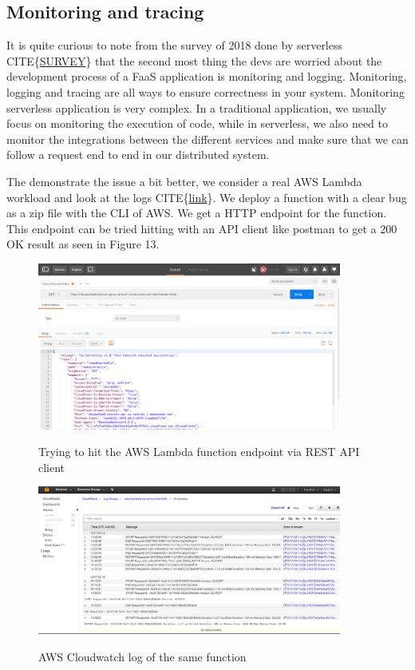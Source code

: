\documentclass[12pt,titlepage]{article}
\begin{document}
\subsection{Monitoring and tracing}
\label{sec:org0285f8c}
It is quite curious to note from the survey of 2018 done by serverless CITE\{\href{https://www.serverless.com/blog/2018-serverless-community-survey-huge-growth-usage}{SURVEY}\} that the
second most thing the devs are worried about the development process of a FaaS
application is monitoring and logging. Monitoring, logging and tracing are all
ways to ensure correctness in your system. Monitoring serverless application is
very complex. In a traditional application, we usually focus on monitoring the
execution of code, while in serverless, we also need to monitor the integrations
between the different services and make sure that we can follow a request end to
end in our distributed system.

The demonstrate the issue a bit better, we consider a real AWS Lambda workload
and look at the logs CITE\{\href{https://www.serverless.com/blog/serverless-monitoring-the-good-the-bad-and-the-ugly}{link}\}. We deploy a function with a clear bug as a zip file with the
CLI of AWS. We get a HTTP endpoint for the function. This endpoint can be tried
hitting with an API client like postman to get a 200 OK result as seen in
Figure 13. 
\begin{figure}[!h]
    \caption{Trying to hit the AWS Lambda function endpoint via REST API client}
    \centering
    \includegraphics[width=100mm]{./thesis_images/postman.png}
    \label{fig:postman}
\end{figure}
\begin{figure}[!h]
    \caption{AWS Cloudwatch log of the same function}
    \centering
    \includegraphics[width=100mm]{./thesis_images/cloudwatch.png}
    \label{fig:cloudwatch}
\end{figure}
\end{document}
